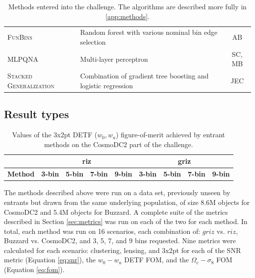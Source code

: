 \documentclass[twocolumn,twocolappendix]{aastex63}
\begin{document}
\begin{table}[]
\begin{tabular}{|l|p{8cm}|c|}
	\textsc{FunBins} & Random forest with various nominal bin edge selection & AB \\
	\textsc{MLPQNA} & Multi-layer perceptron & SC, MB \\
	\textsc{Stacked Generalization} & Combination of gradient tree boosting and logistic regression & JEC\\
	\hline
	\end{tabular}
	\caption{Methods entered into the challenge. The algorithms are described more fully in \autoref{app:methods}.}
	\label{tab:entrants}
\end{table}



\subsection{Result types}

\begin{table}[]
	\begin{tabular}{|l|llll|llll|}
		\hline
		& \multicolumn{4}{c|}{\textbf{riz}}      & \multicolumn{4}{c|}{\textbf{griz}}                                \\ \hline
		\textbf{Method} & \textbf{3-bin} & \textbf{5-bin} & \textbf{7-bin} & \textbf{9-bin} & \textbf{3-bin} & \textbf{5-bin} & \textbf{7-bin} & \textbf{9-bin} \\ \hline
		
		\hline
	\end{tabular}
	\caption{Values of the 3x2pt DETF ($w_0,w_a$) figure-of-merit achieved by entrant methods on the 
		CosmoDC2 part of the challenge.}
	\label{tab:cosmodc2}
\end{table}

The methods described above were run on a data set, previously unseen by entrants but drawn
from the same underlying population, of size 8.6M objects for CosmoDC2 and 5.4M objects for Buzzard.
A complete suite of the metrics described in Section \ref{sec:metrics} was run on each of the two
for each method.  In total, each method was run on 16 scenarios, each combination of: $griz$ vs. $riz$,
Buzzard vs. CosmoDC2, and 3, 5, 7, and 9 bins requested.  Nine metrics were calculated for each
scenario: clustering, lensing, and 3x2pt for each of the SNR metric (Equation \ref{eq:snr}), the $w_0-w_a$ 
DETF FOM, and the $\Omega_c - \sigma_8$ FOM (Equation \ref{eq:fom}).
\end{document}
